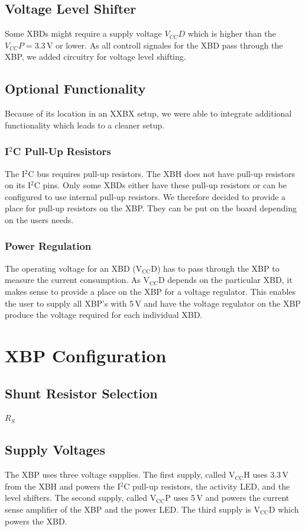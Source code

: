 \documentclass[twoside,11pt]{cergdoc}
\begin{document}
\section{Voltage Level Shifter}
Some XBDs might require a supply voltage $V_{CC}D$ which is higher than the $V_{CC}P = 3.3$\,V
or lower. As all controll signales for the XBD pass through the XBP, we added circuitry for
voltage level shifting. 

\section{Optional Functionality}
Because of its location in an XXBX setup, we were able to integrate additional 
functionality which leads to a cleaner setup.

\subsection{I$^2$C Pull-Up Resistors}
The I$^2$C bus requires pull-up resistors. The XBH does not have pull-up resistors on 
its I$^2$C pins. Only some XBDs either have these pull-up
resistors or can be configured to use internal pull-up resistors. We therefore decided
to provide a place for pull-up resistors on the XBP. They can be put on the board 
depending on the users needs.

\subsection{Power Regulation}
The operating voltage for an XBD ($\mathrm{V_{CC}D}$) has to pass through the XBP to measure the 
current consumption. As $\mathrm{V_{CC}D}$ depends on the particular XBD,
it makes sense to provide a place on the XBP for a voltage regulator. This 
enables the user to supply all XBP's with 5\,V and have the voltage regulator
on the XBP produce the voltage required for each individual XBD.

\chapter{XBP Configuration}

\section{Shunt Resistor Selection}
$R_S$

\section{Supply Voltages}
The XBP uses three voltage supplies. The first supply, called $\mathrm{V_{CC}H}$
uses 3.3\,V from the XBH and powers the I$^2$C pull-up resistors, the activity LED, 
and the level shifters.
The second supply, called $\mathrm{V_{CC}P}$ uses 5\,V and powers the current
sense amplifier of the XBP and the power LED. 
The third supply is $\mathrm{V_{CC}D}$ which powers the XBD.
\end{document}
